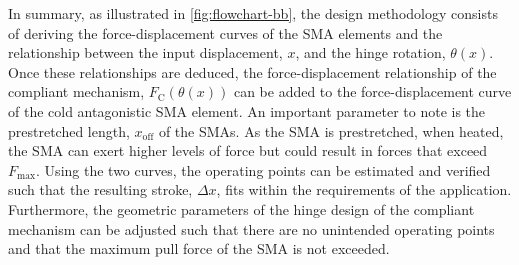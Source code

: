In summary, as illustrated in \cref{fig:flowchart-bb}, the design methodology consists of deriving the force-displacement curves of the SMA elements and the relationship between the input displacement, $x$, and the hinge rotation, $\theta(x)$. Once these relationships are deduced, the force-displacement relationship of the compliant mechanism, $F_\mathrm{C}(\theta(x))$ can be added to the force-displacement curve of the cold antagonistic SMA element. An important parameter to note is the prestretched length, $x_\mathrm{off}$ of the SMAs. As the SMA is prestretched, when heated, the SMA can exert higher levels of force but could result in forces that exceed $F_\mathrm{max}$. Using the two curves, the operating points can be estimated and verified such that the resulting stroke, $\Delta x$, fits within the requirements of the application. Furthermore, the geometric parameters of the hinge design of the compliant mechanism can be adjusted such that there are no unintended operating points and that the maximum pull force of the SMA is not exceeded.

